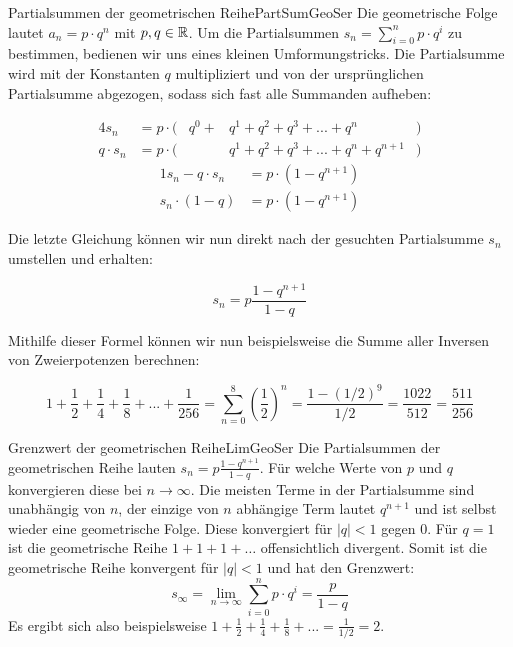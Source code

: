 \begin{example}{Partialsummen der geometrischen Reihe}{PartSumGeoSer}
	Die geometrische Folge lautet $a_n = p \cdot q^n$ mit $p,q\in\mathbb{R}$. Um die Partialsummen $s_n = \sum\limits_{i=0}^n p\cdot q^i$ zu bestimmen, bedienen wir uns eines kleinen Umformungstricks. Die Partialsumme wird mit der Konstanten $q$ multipliziert und von der ursprünglichen Partialsumme abgezogen, sodass sich fast alle Summanden aufheben:

	\begin{alignat*}{4}
		        s_n       &= p \cdot ( & q^0 + & q^1 + q^2 + q^3 + ... + q^n           &) \\
		q \cdot s_n       &= p \cdot ( &       & q^1 + q^2 + q^3 + ... + q^n + q^{n+1} &)
	\end{alignat*}
	\begin{alignat*}{1}
		s_n - q \cdot s_n &= p \cdot (1 - q^{n+1}) \\
          s_n \cdot (1-q) &= p \cdot (1 - q^{n+1})
	\end{alignat*}

	Die letzte Gleichung können wir nun direkt nach der gesuchten Partialsumme $s_n$ umstellen und erhalten:

	\begin{equation}
	  s_n = p \frac{1 - q^{n+1}}{1 - q}
	\end{equation}

	Mithilfe dieser Formel können wir nun beispielsweise die Summe aller Inversen von Zweierpotenzen berechnen:

	$$
	 1 + \frac{1}{2} + \frac{1}{4} + \frac{1}{8} + ... + \frac{1}{256} = \sum\limits_{n=0}^8 (\frac{1}{2})^n = \frac{1 - (1/2)^9}{1/2} = \frac{1022}{512} = \frac{511}{256}
	$$
\end{example}

\begin{example}{Grenzwert der geometrischen Reihe}{LimGeoSer}
    Die Partialsummen der geometrischen Reihe lauten $s_n = p \frac{1 - q^{n+1}}{1 - q}$. Für welche Werte von $p$ und $q$ konvergieren diese bei $n\to\infty$. Die meisten Terme in der Partialsumme sind unabhängig von $n$, der einzige von $n$ abhängige Term lautet $q^{n+1}$ und ist selbst wieder eine geometrische Folge. Diese konvergiert für $|q| < 1$ gegen $0$. Für $q=1$ ist die geometrische Reihe $1+1+1+\dots$ offensichtlich divergent. Somit ist die geometrische Reihe konvergent für $|q|<1$ und hat den Grenzwert:
    $$
        s_\infty = \lim\limits_{n\to\infty} \sum\limits_{i=0}^n p\cdot q^i = \frac{p}{1-q}
    $$
    Es ergibt sich also beispielsweise $1 + \frac{1}{2} + \frac{1}{4} + \frac{1}{8} + ... = \frac{1}{1/2} = 2$.
\end{example}

